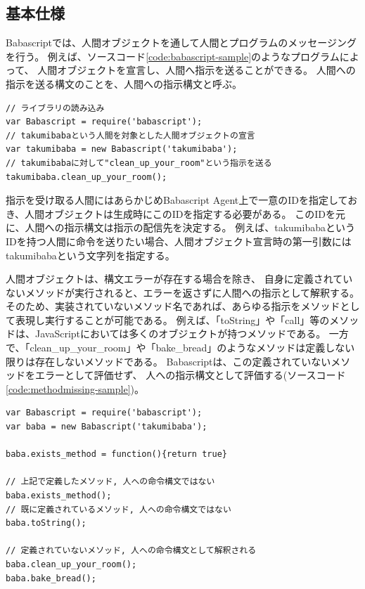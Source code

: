 \subsection{基本仕様}\label{ux57faux672cux4ed5ux69d8}

Babascriptでは、人間オブジェクトを通して人間とプログラムのメッセージングを行う。
例えば、ソースコード\ref{code:babascript-sample}のようなプログラムによって、
人間オブジェクトを宣言し、人間へ指示を送ることができる。
人間への指示を送る構文のことを、人間への指示構文と呼ぶ。

\begin{lstlisting}[caption=人への指示構文, label=code:babascript-sample]
// ライブラリの読み込み
var Babascript = require('babascript');
// takumibabaという人間を対象とした人間オブジェクトの宣言
var takumibaba = new Babascript('takumibaba');
// takumibabaに対して"clean_up_your_room"という指示を送る
takumibaba.clean_up_your_room();
\end{lstlisting}

指示を受け取る人間にはあらかじめBabascript
Agent上で一意のIDを指定しておき、人間オブジェクトは生成時にこのIDを指定する必要がある。
このIDを元に、人間への指示構文は指示の配信先を決定する。
例えば、takumibabaというIDを持つ人間に命令を送りたい場合、人間オブジェクト宣言時の第一引数にはtakumibabaという文字列を指定する。

人間オブジェクトは、構文エラーが存在する場合を除き、
自身に定義されていないメソッドが実行されると、エラーを返さずに人間への指示として解釈する。
そのため、実装されていないメソッド名であれば、あらゆる指示をメソッドとして表現し実行することが可能である。
例えば、「toString」や「call」等のメソッドは、JavaScriptにおいては多くのオブジェクトが持つメソッドである。
一方で、「clean\_up\_your\_room」や「bake\_bread」のようなメソッドは定義しない限りは存在しないメソッドである。
Babascriptは、この定義されていないメソッドをエラーとして評価せず、
人への指示構文として評価する(ソースコード\ref{code:methodmissing-sample})。

\begin{lstlisting}[caption=通常のメソッドと指示構文の例, label=code:methodmissing-sample]
var Babascript = require('babascript');
var baba = new Babascript('takumibaba');

baba.exists_method = function(){return true}

// 上記で定義したメソッド, 人への命令構文ではない
baba.exists_method();
// 既に定義されているメソッド, 人への命令構文ではない
baba.toString();

// 定義されていないメソッド, 人への命令構文として解釈される
baba.clean_up_your_room();
baba.bake_bread();
\end{lstlisting}

